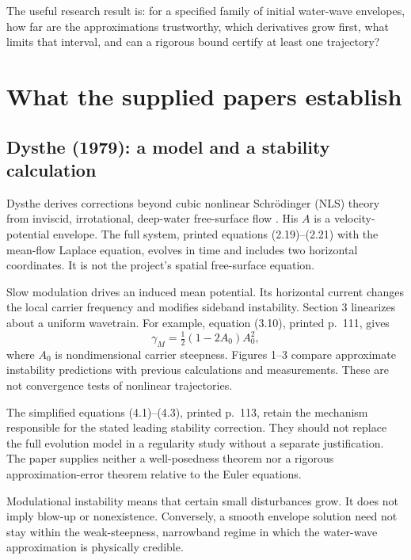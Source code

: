 \documentclass[11pt]{article}
\begin{document}
The useful research result is: for a specified family of initial
water-wave envelopes, how far are the approximations trustworthy,
which derivatives grow first, what limits that interval, and can a
rigorous bound certify at least one trajectory?

\section{What the supplied papers establish}
\subsection{Dysthe (1979): a model and a stability calculation}
Dysthe derives corrections beyond cubic nonlinear Schr\"odinger (NLS)
theory from inviscid, irrotational, deep-water free-surface flow
\cite{dysthe}. His \(A\) is a velocity-potential envelope. The full
system, printed equations (2.19)--(2.21) with the mean-flow Laplace
equation, evolves in time and includes two horizontal coordinates.
It is not the project's spatial free-surface equation.

Slow modulation drives an induced mean potential. Its horizontal
current changes the local carrier frequency and modifies sideband
instability. Section 3 linearizes about a uniform wavetrain.
For example, equation (3.10), printed p.~111, gives
\[
 \gamma_M=\tfrac12(1-2A_0)A_0^2,
\]
where \(A_0\) is nondimensional carrier steepness. Figures 1--3 compare
approximate instability predictions with previous calculations and
measurements. These are not convergence tests of nonlinear trajectories.

The simplified equations (4.1)--(4.3), printed p.~113, retain the
mechanism responsible for the stated leading stability correction.
They should not replace the full evolution model in a regularity study
without a separate justification. The paper supplies neither a
well-posedness theorem nor a rigorous approximation-error theorem
relative to the Euler equations.

\begin{remark}
Modulational instability means that certain small disturbances grow.
It does not imply blow-up or nonexistence. Conversely, a smooth
envelope solution need not stay within the weak-steepness, narrowband
regime in which the water-wave approximation is physically credible.
\end{remark}
\end{document}
